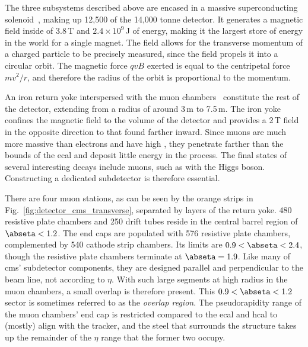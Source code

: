 The three subsystems described above are encased in a massive superconducting solenoid~\cite{CERN-LHCC-97-010}, making up 12,500 of the 14,000 tonne detector. It generates a magnetic field inside of 3.8\,T and $\text{2.4} \times \text{10}^9$\,J of energy, making it the largest store of energy in the world for a single magnet. The field allows for the transverse momentum of a charged particle to be precisely measured, since the field propels it into a circular orbit. The magnetic force $qvB$ exerted is equal to the centripetal force $mv^2/r$, and therefore the radius of the orbit is proportional to the momentum.

An iron return yoke interspersed with the muon chambers~\cite{Layter:343814} constitute the rest of the detector, extending from a radius of around 3\,m to 7.5\,m. The iron yoke confines the magnetic field to the volume of the detector and provides a 2\,T field in the opposite direction to that found farther inward. Since muons are much more massive than electrons and have high \pt, they penetrate farther than the bounds of the \acrshort{ecal} and deposit little energy in the process. The final states of several interesting decays include muons, such as with the Higgs boson. Constructing a dedicated subdetector is therefore essential.

There are four muon stations, as can be seen by the orange strips in Fig.~\ref{fig:detector_cms_transverse}, separated by layers of the return yoke. 480 resistive plate chambers and 250 drift tubes reside in the central barrel region of $\abseta < \text{1.2}$. The end caps are populated with 576 resistive plate chambers, complemented by 540 cathode strip chambers. Its limits are $\text{0.9} < \abseta < \text{2.4}$, though the resistive plate chambers terminate at $\abseta = \text{1.9}$. Like many of \acrshort{cms}' subdetector components, they are designed parallel and perpendicular to the beam line, not according to $\eta$. With such large segments at high radius in the muon chambers, a small overlap is therefore present. This $\text{0.9} < \abseta < \text{1.2}$ sector is sometimes referred to as the \emph{overlap region}. The pseudorapidity range of the muon chambers' end cap is restricted compared to the \acrshort{ecal} and \acrshort{hcal} to (mostly) align with the tracker, and the steel that surrounds the structure takes up the remainder of the $\eta$ range that the former two occupy.

